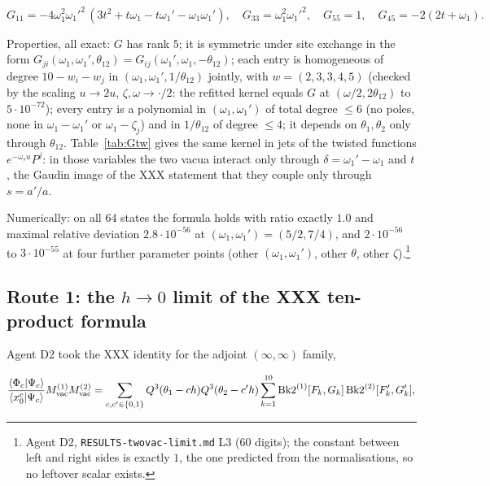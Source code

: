 \documentclass[11pt]{article}
\begin{document}
\begin{equation}
G_{11}=-4\omega_1^2\omega_1'^2\,(3t^2+t\omega_1-t\omega_1'-\omega_1\omega_1'),\quad G_{33}=\omega_1^2\omega_1'^2,\quad G_{55}=1,\quad G_{45}=-2(2t+\omega_1).\label{eq:Gsome}
\end{equation}

Properties, all exact: $G$ has rank $5$; it is symmetric under site exchange in the form $G_{ji}(\omega_1,\omega_1',\theta_{12})=G_{ij}(\omega_1',\omega_1,-\theta_{12})$; each entry is homogeneous of degree $10-w_i-w_j$ in $(\omega_1,\omega_1',1/\theta_{12})$ jointly, with $w=(2,3,3,4,5)$ (checked by the scaling $u\to2u$, $\zeta,\omega\to\cdot/2$: the refitted kernel equals $G$ at $(\omega/2,2\theta_{12})$ to $5\cdot10^{-72}$); every entry is a polynomial in $(\omega_1,\omega_1')$ of total degree $\le6$ (no poles, none in $\omega_1-\omega_1'$ or $\omega_1-\zeta_j$) and in $1/\theta_{12}$ of degree $\le4$; it depends on $\theta_1,\theta_2$ only through $\theta_{12}$. Table~\ref{tab:Gtw} gives the same kernel in jets of the twisted functions $e^{-\omega_su}P^j$: in those variables the two vacua interact only through $\delta=\omega_1'-\omega_1$ and $t$, the Gaudin image of the XXX statement that they couple only through $s=a'/a$.

Numerically: on all 64 states the formula holds with ratio exactly $1.0$ and maximal relative deviation $2.8\cdot10^{-56}$ at $(\omega_1,\omega_1')=(5/2,7/4)$, and $2\cdot10^{-56}$ to $3\cdot10^{-55}$ at four further parameter points (other $(\omega_1,\omega_1')$, other $\theta$, other $\zeta$).\footnote{Agent D2, \texttt{RESULTS-\allowbreak{}twovac-\allowbreak{}limit.\allowbreak{}md} L3 (60 digits); the constant between left and right sides is exactly $1$, the one predicted from the normalisations, so no leftover scalar exists.}

\subsection{Route 1: the \texorpdfstring{$h\to0$}{h0} limit of the XXX ten-product formula}\label{sec:route1}

Agent D2 took the XXX identity for the adjoint $(\infty,\infty)$ family,

\begin{equation}
\frac{\langle\Phi_c|\Psi_c\rangle}{\langle x_0^c|\Psi_c\rangle}M^{(1)}_{\rm vac}M^{(2)}_{\rm vac}=\sum_{c,c'\in\{0,1\}}Q^3(\theta_1-ch)Q^3(\theta_2-c'h)\sum_{k=1}^{10}\mathrm{Bk2}^{(1)}[F_k,G_k]\,\mathrm{Bk2}^{(2)}[F'_k,G'_k],\label{eq:xxx10}
\end{equation}
\end{document}
